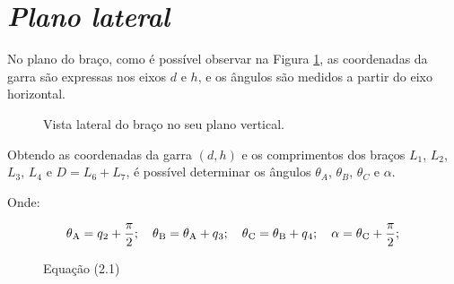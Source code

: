 \section{\textit{Plano lateral}}
\label{sec:plano_lateral}

No plano do braço, como é possível observar na Figura \ref{fig:lateral}, as coordenadas da garra são expressas nos eixos $d$ e $h$, e os ângulos são medidos a partir do eixo horizontal.   

\begin{figure}[h]
  \centering
  \resizebox{0.6\textwidth}{!}{}
  \caption{Vista lateral do braço no seu plano vertical.}
  \label{fig:lateral}
\end{figure}

Obtendo as coordenadas da garra $(d, h)$ e os comprimentos dos braços $L_1$, $L_2$, $L_3$, $L_4$ e $D = L_6 + L_7$, é possível determinar os ângulos $\theta_A$, $\theta_B$, $\theta_C$ e $\alpha$.

Onde:

\begin{figure}[!h]
\centering
    \begin{equation}
        \theta\textsubscript{A} = q\textsubscript{2} + \frac{\pi}{2}; \quad
        \theta\textsubscript{B} = \theta\textsubscript{A} + q\textsubscript{3}; \quad
        \theta\textsubscript{C} = \theta\textsubscript{B} + q\textsubscript{4}; \quad
        \alpha = \theta\textsubscript{C} + \frac{\pi}{2};
        \label{eq:2.1}
    \end{equation}
    \caption*{Equação (2.1)}
\end{figure}

\clearpage